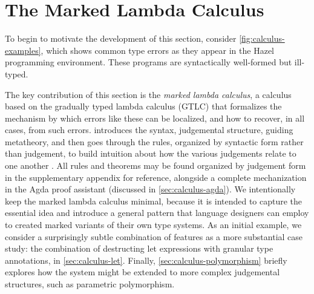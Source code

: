 \section{The Marked Lambda Calculus}
\label{sec:calculus}

To begin to motivate the development of this section, consider \cref{fig:calculus-examples}, which
shows common type errors as they appear in the Hazel programming environment. These programs are
syntactically well-formed but ill-typed.




The key contribution of this section is the \emph{marked lambda calculus}, a calculus based on the
gradually typed lambda calculus (GTLC) that formalizes the mechanism by which errors like these can
be localized, and how to recover, in all cases, from such errors. 
 introduces the syntax, judgemental structure, guiding metatheory, and
then goes through the rules, organized by syntactic form rather than judgement, to build intuition
about how the various judgements relate to one another \cite{Siek06a}.
All rules and theorems may be found organized by judgement form in the supplementary appendix for
reference, alongside a complete mechanization in the Agda proof assistant \cite{norell:thesis}
(discussed in \cref{sec:calculus-agda}).
We intentionally keep the marked lambda calculus minimal, because it is intended to capture the
essential idea and introduce a general pattern that language designers can employ to created marked
variants of their own type systems.
As an initial example, we consider a surprisingly subtle combination of features as a more
substantial case study: the combination of destructing let expressions with granular type
annotations, in \cref{sec:calculus-let}.
Finally, \cref{sec:calculus-polymorphism} briefly explores how the system might be extended to more
complex judgemental structures, such as parametric polymorphism.


